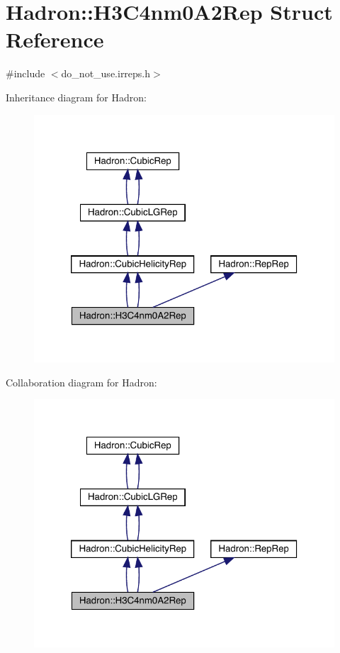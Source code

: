 \hypertarget{structHadron_1_1H3C4nm0A2Rep}{}\section{Hadron\+:\+:H3\+C4nm0\+A2\+Rep Struct Reference}
\label{structHadron_1_1H3C4nm0A2Rep}


{\ttfamily \#include $<$do\+\_\+not\+\_\+use.\+irreps.\+h$>$}



Inheritance diagram for Hadron\+:\nopagebreak
\begin{figure}[H]
\begin{center}
\leavevmode
\includegraphics[width=320pt]{dd/d5b/structHadron_1_1H3C4nm0A2Rep__inherit__graph}
\end{center}
\end{figure}


Collaboration diagram for Hadron\+:\nopagebreak
\begin{figure}[H]
\begin{center}
\leavevmode
\includegraphics[width=320pt]{da/d1a/structHadron_1_1H3C4nm0A2Rep__coll__graph}
\end{center}
\end{figure}
